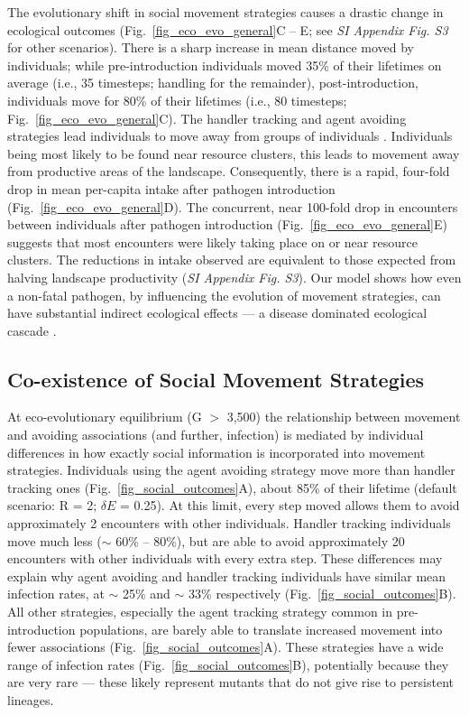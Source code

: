 The evolutionary shift in social movement strategies causes a drastic change in ecological outcomes (Fig.~\ref{fig_eco_evo_general}C -- E; see \textit{SI Appendix Fig. S3} for other scenarios).
There is a sharp increase in mean distance moved by individuals; while pre-introduction individuals moved 35\% of their lifetimes on average (i.e., 35 timesteps; handling for the remainder), post-introduction, individuals move for 80\% of their lifetimes (i.e., 80 timesteps; Fig.~\ref{fig_eco_evo_general}C).
The handler tracking and agent avoiding strategies lead individuals to move away from groups of individuals \autocite[`dynamic social distancing';][]{pusceddu2021}.
Individuals being most likely to be found near resource clusters, this leads to movement away from productive areas of the landscape.
Consequently, there is a rapid, four-fold drop in mean per-capita intake after pathogen introduction (Fig.~\ref{fig_eco_evo_general}D).
The concurrent, near 100-fold drop in encounters between individuals after pathogen introduction (Fig.~\ref{fig_eco_evo_general}E) suggests that most encounters were likely taking place on or near resource clusters.
The reductions in intake observed are equivalent to those expected from halving landscape productivity (\textit{SI Appendix Fig. S3}).
Our model shows how even a non-fatal pathogen, by influencing the evolution of movement strategies, can have substantial indirect ecological effects --- a disease dominated ecological cascade \autocite{monk2022}.

\subsection*{Co-existence of Social Movement Strategies}

At eco-evolutionary equilibrium (G $>$ 3,500) the relationship between movement and avoiding associations (and further, infection) is mediated by individual differences in how exactly social information is incorporated into movement strategies.
Individuals using the agent avoiding strategy move more than handler tracking ones (Fig.~\ref{fig_social_outcomes}A), about 85\% of their lifetime (default scenario: R = 2; $\delta E$ = 0.25).
At this limit, every step moved allows them to avoid approximately 2 encounters with other individuals.
Handler tracking individuals move much less ($\sim$ 60\% -- 80\%), but are able to avoid approximately 20 encounters with other individuals with every extra step.
These differences may explain why agent avoiding and handler tracking individuals have similar mean infection rates, at $\sim$ 25\% and $\sim$ 33\% respectively (Fig.~\ref{fig_social_outcomes}B).
All other strategies, especially the agent tracking strategy common in pre-introduction populations, are barely able to translate increased movement into fewer associations (Fig.~\ref{fig_social_outcomes}A).
These strategies have a wide range of infection rates (Fig.~\ref{fig_social_outcomes}B), potentially because they are very rare --- these likely represent mutants that do not give rise to persistent lineages.


